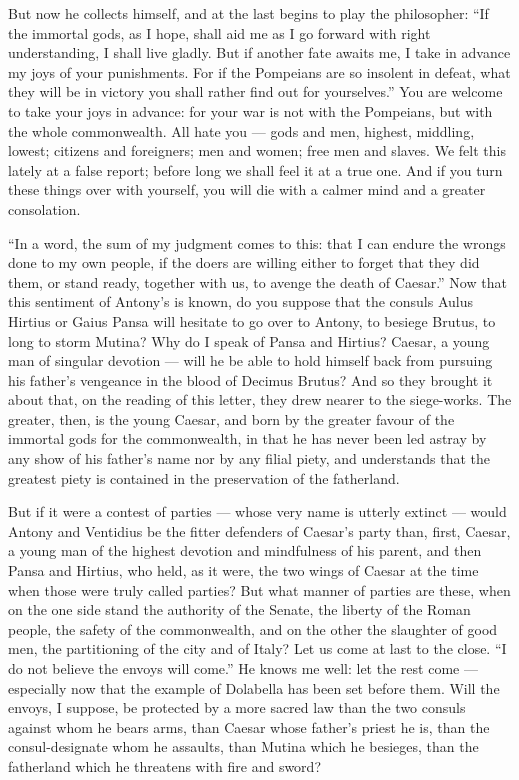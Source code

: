  But now he collects himself, and at the last begins to play the philosopher: ``If the immortal gods, as I hope, shall aid me as I go forward with right understanding, I shall live gladly. But if another fate awaits me, I take in advance my joys of your punishments. For if the Pompeians are so insolent in defeat, what they will be in victory you shall rather find out for yourselves.'' You are welcome to take your joys in advance: for your war is not with the Pompeians, but with the whole commonwealth. All hate you --- gods and men, highest, middling, lowest; citizens and foreigners; men and women; free men and slaves. We felt this lately at a false report; before long we shall feel it at a true one. And if you turn these things over with yourself, you will die with a calmer mind and a greater consolation.

 ``In a word, the sum of my judgment comes to this: that I can endure the wrongs done to my own people, if the doers are willing either to forget that they did them, or stand ready, together with us, to avenge the death of Caesar.'' Now that this sentiment of Antony's is known, do you suppose that the consuls Aulus Hirtius or Gaius Pansa will hesitate to go over to Antony, to besiege Brutus, to long to storm Mutina? Why do I speak of Pansa and Hirtius? Caesar, a young man of singular devotion --- will he be able to hold himself back from pursuing his father's vengeance in the blood of Decimus Brutus? And so they brought it about that, on the reading of this letter, they drew nearer to the siege-works. The greater, then, is the young Caesar, and born by the greater favour of the immortal gods for the commonwealth, in that he has never been led astray by any show of his father's name nor by any filial piety, and understands that the greatest piety is contained in the preservation of the fatherland.

 But if it were a contest of parties --- whose very name is utterly extinct --- would Antony and Ventidius be the fitter defenders of Caesar's party than, first, Caesar, a young man of the highest devotion and mindfulness of his parent, and then Pansa and Hirtius, who held, as it were, the two wings of Caesar at the time when those were truly called parties? But what manner of parties are these, when on the one side stand the authority of the Senate, the liberty of the Roman people, the safety of the commonwealth, and on the other the slaughter of good men, the partitioning of the city and of Italy? Let us come at last to the close. ``I do not believe the envoys will come.'' He knows me well: let the rest come --- especially now that the example of Dolabella has been set before them. Will the envoys, I suppose, be protected by a more sacred law than the two consuls against whom he bears arms, than Caesar whose father's priest he is, than the consul-designate whom he assaults, than Mutina which he besieges, than the fatherland which he threatens with fire and sword?

